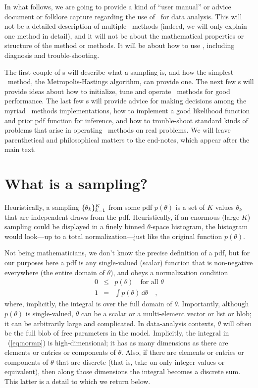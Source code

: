 \documentclass[12pt,twoside,pdftex]{article}
\newcommand{\MCMC}{\acronym{MCMC}}
\newcommand{\pars}{\theta}
\begin{document}
In what follows, we are going to provide a kind of ``user manual'' or
advice document or folklore capture regarding the use of \MCMC\ for
data analysis.
This will not be a detailed description of multiple \MCMC\ methods
(indeed, we will only explain one method in detail), and it will not
be about the mathematical properties or structure of the method or
methods.
It will be about how to use \MCMC, including diagnosis and
trouble-shooting.

The first couple of \sectionname s will describe what a sampling is, and how
the simplest \MCMC\ method, the Metropolis-Hastings algorithm, can
provide one.
The next few \sectionname s will provide ideas about how to
initialize, tune and operate \MCMC\ methods for good performance.
The last few \sectionname s will provide advice for making decisions
among the myriad \MCMC\ methods implementations, how to implement a good
likelihood function and prior pdf function for inference, and how to
trouble-shoot standard kinds of problems that arise in operating \MCMC\ 
methods on real problems.
We will leave parenthetical and philosophical matters to the end-notes,
which appear after the main text.

\section{What is a sampling?}\label{sec:sampling}

Heuristically, a sampling $\setof{\pars_k}_{k=1}^K$ from some pdf $p(\pars)$
is a set of $K$ values $\pars_k$ that are independent draws from the pdf.
Heuristically, if an enormous (large $K$) sampling could be displayed
in a finely binned $\pars$-space histogram, the histogram would look---up
to a total normalization---just like the original function $p(\pars)$.

Not being mathematicians, we don't know the precise definition of a
pdf, but for our purposes here a pdf is
any single-valued (scalar) function that is non-negative everywhere
(the entire domain of $\pars$), and obeys a normalization condition
\begin{eqnarray}
0 &\leq& p(\pars) \quad \mbox{for all $\pars$}
\\ \label{eq:normp}
1 &=& \int p(\pars)\,\dd\pars
\quad ,
\end{eqnarray}
where, implicitly, the integral is over the full domain of $\pars$.
Importantly, although $p(\pars)$ is single-valued, $\pars$ can be a scalar or
a multi-element vector or list or blob; it can be arbitrarily large
and complicated.
In data-analysis contexts, $\pars$ will often be the full blob of free
parameters in the model.
Implicitly, the integral in \equationname~(\ref{eq:normp}) is high-dimensional; it
has as many dimensions as there are elements or entries or components of $\pars$.
Also, if there are elements or entries or components of $\pars$ that are discrete
(that is, take on only integer values or equivalent),
then along those dimensions the integral becomes a discrete sum.
This latter is a detail to which we return below.
\end{document}
